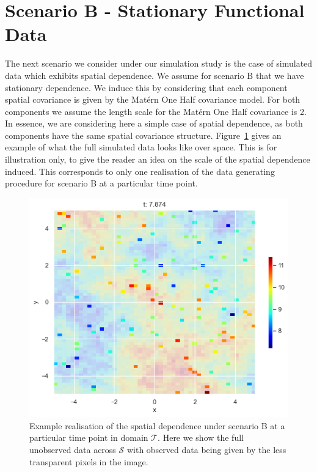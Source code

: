 \section{Scenario B - Stationary Functional Data \label{sec:sim_B}}
The next scenario we consider under our simulation study is the case of simulated data which exhibits spatial dependence.
We assume for scenario B that we have stationary dependence.
We induce this by considering that each component spatial covariance is given by the Mat\'ern One Half covariance model.
For both components we assume the length scale for the Mat\'ern One Half covariance is 2.
In essence, we are considering here a simple case of spatial dependence, as both components have the same spatial covariance structure.
Figure~\ref{fig:ex_spa_B} gives an example of what the full simulated data looks like over space.
This is for illustration only, to give the reader an idea on the scale of the spatial dependence induced.
This corresponds to only one realisation of the data generating procedure for scenario B at a particular time point.

\begin{figure}
	\centering
	\includegraphics[width=\textwidth]{ex_spa_B}
	\caption{Example realisation of the spatial dependence under scenario B at a particular time point in domain $\mathcal{T}$. Here we show the full unobserved data across $\mathcal{S}$ with observed data being given by the less transparent pixels in the image.}
	\label{fig:ex_spa_B}
\end{figure}

